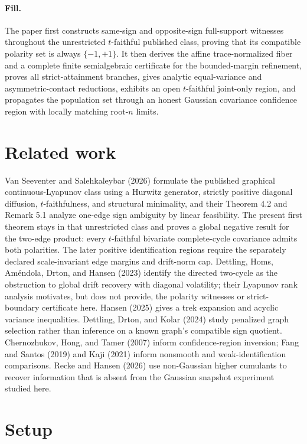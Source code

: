 \documentclass{article}
\begin{document}
\paragraph{Fill.} The paper first constructs same-sign and opposite-sign full-support witnesses throughout the unrestricted \(t\)-faithful published class, proving that its compatible polarity set is always \(\{-1,+1\}\). It then derives the affine trace-normalized fiber and a complete finite semialgebraic certificate for the bounded-margin refinement, proves all strict-attainment branches, gives analytic equal-variance and asymmetric-contact reductions, exhibits an open \(t\)-faithful joint-only region, and propagates the population set through an honest Gaussian covariance confidence region with locally matching root-\(n\) limits.

\section{Related work}

Van Seeventer and Salehkaleybar (2026) formulate the published graphical continuous-Lyapunov class using a Hurwitz generator, strictly positive diagonal diffusion, \(t\)-faithfulness, and structural minimality, and their Theorem 4.2 and Remark 5.1 analyze one-edge sign ambiguity by linear feasibility. The present first theorem stays in that unrestricted class and proves a global negative result for the two-edge product: every \(t\)-faithful bivariate complete-cycle covariance admits both polarities. The later positive identification regions require the separately declared scale-invariant edge margins and drift-norm cap. Dettling, Homs, Améndola, Drton, and Hansen (2023) identify the directed two-cycle as the obstruction to global drift recovery with diagonal volatility; their Lyapunov rank analysis motivates, but does not provide, the polarity witnesses or strict-boundary certificate here. Hansen (2025) gives a trek expansion and acyclic variance inequalities. Dettling, Drton, and Kolar (2024) study penalized graph selection rather than inference on a known graph's compatible sign quotient. Chernozhukov, Hong, and Tamer (2007) inform confidence-region inversion; Fang and Santos (2019) and Kaji (2021) inform nonsmooth and weak-identification comparisons. Recke and Hansen (2026) use non-Gaussian higher cumulants to recover information that is absent from the Gaussian snapshot experiment studied here.

\section{Setup}
\end{document}
